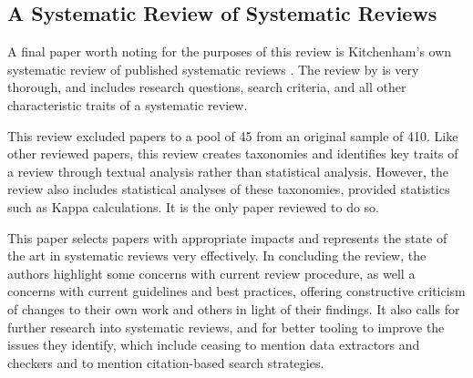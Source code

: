 \subsection{A Systematic Review of Systematic Reviews}
A final paper worth noting for the purposes of this review is Kitchenham's own systematic review of published systematic reviews \citep{Kitchenham2013}. The review by \citeauthor*{Kitchenham2013} is very thorough, and includes research questions, search criteria, and all other characteristic traits of a systematic review.\par

This review excluded papers to a pool of 45 from an original sample of 410. Like other reviewed papers, this review creates taxonomies and identifies key traits of a review through textual analysis rather than statistical analysis. However, the review also includes statistical analyses of these taxonomies, provided statistics such as Kappa calculations. It is the only paper reviewed to do so.\par

This paper selects papers with appropriate impacts and represents the state of the art in systematic reviews very effectively. In concluding the review, the authors highlight some concerns with current review procedure, as well a concerns with current guidelines and best practices, offering constructive criticism of changes to their own work and others in light of their findings. It also calls for further research into systematic reviews, and for better tooling to improve the issues they identify, which include ceasing to mention data extractors and checkers and to mention citation-based search strategies.\par

